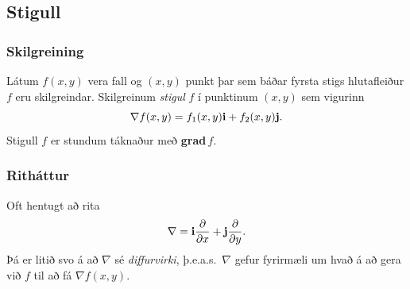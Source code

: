 \subsection{Stigull} 

\subsubsection{Skilgreining }

 Látum $f(x,y)$ vera fall og $(x,y)$ punkt þar
sem báðar fyrsta stigs hlutafleiður $f$ eru skilgreindar.  Skilgreinum
{\em stigul} $f$ í punktinum $(x,y)$ sem vigurinn 
$$\nabla f(x,y)=f_1(x,y)\mbox{${\bf i}$}+f_2(x,y)\mbox{${\bf j}$}.$$
Stigull $f$ er stundum táknaður með {\bf grad}$\,f$.



\subsubsection{Ritháttur }
Oft hentugt að rita
$$\nabla=\mbox{${\bf i}$}\frac{\partial}{\partial x}+ \mbox{${\bf j}$}\frac{\partial}{\partial y}.$$
Þá er litið svo á að $\nabla$ sé {\em diffurvirki}, þ.e.a.s.\ $\nabla$
gefur fyrirmæli um hvað á að gera við $f$ til að fá $\nabla f(x,y)$.




